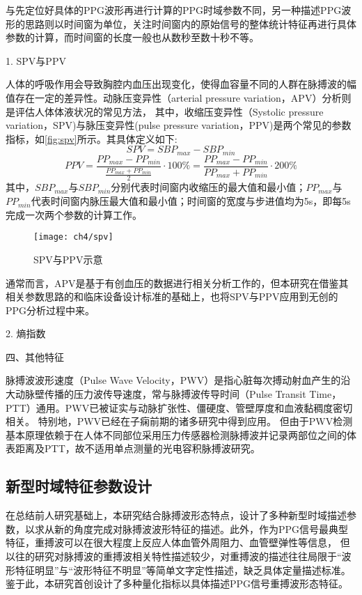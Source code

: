 与先定位好具体的PPG波形再进行计算的PPG时域参数不同，另一种描述PPG波形的思路则以时间窗为单位，关注时间窗内的原始信号的整体统计特征再进行具体参数的计算，而时间窗的长度一般也从数秒至数十秒不等。

1. SPV与PPV

人体的呼吸作用会导致胸腔内血压出现变化，使得血容量不同的人群在脉搏波的幅值存在一定的差异性。动脉压变异性（arterial pressure variation，APV）分析则是评估人体体液状况的常见方法，
其中，收缩压变异性（Systolic pressure variation，SPV)与脉压变异性(pulse pressure variation，PPV)是两个常见的参数指标\cite{GE2021,Michard1999,Perel1987,Michard2005}，如\autoref{fig:spv}所示。其具体定义如下\cite{GE2021}:
\begin{equation}
    \label{equ:spv}
    SPV=SBP_{max}-SBP_{min}
\end{equation}
\begin{equation}
    \label{equ:ppv}
    PPV=\frac{PP_{max}-PP_{min}}{\frac{PP_{max}+PP_{min}}{2}}\cdot 100\%=\frac{PP_{max}-PP_{min}}{PP_{max}+PP_{min}}\cdot 200\%
\end{equation}
其中，$SBP_{max}$与$SBP_{min}$分别代表时间窗内收缩压的最大值和最小值；$PP_{max}$与$PP_{min}$代表时间窗内脉压最大值和最小值；时间窗的宽度与步进值均为5s，即每5s完成一次两个参数的计算工作。
\begin{figure}[htbp]
    \centering
    \texttt{[image: ch4/spv]}
    \caption{\label{fig:spv}SPV与PPV示意}
\end{figure}

通常而言，APV是基于有创血压的数据进行相关分析工作的，但本研究在借鉴其相关参数思路的和临床设备设计标准的基础上，也将SPV与PPV应用到无创的PPG分析过程中来。

2. 熵指数

四、其他特征

脉搏波波形速度（Pulse Wave Velocity，PWV）是指心脏每次搏动射血产生的沿大动脉壁传播的压力波传导速度，常与脉搏波传导时间（Pulse Transit Time，PTT）通用。PWV已被证实与动脉扩张性、僵硬度、管壁厚度和血液黏稠度密切相关。
特别地，PWV已经在子痫前期的诸多研究中得到应用\cite{Tomsin2012,Katsipi2014,VivianaIvan2018,Ira2014}。
但由于PWV检测基本原理依赖于在人体不同部位采用压力传感器检测脉搏波并记录两部位之间的体表距离及PTT，故不适用单点测量的光电容积脉搏波研究。

\subsection{新型时域特征参数设计}
在总结前人研究基础上，本研究结合脉搏波形态特点，设计了多种新型时域描述参数，以求从新的角度完成对脉搏波波形特征的描述。此外，作为PPG信号最典型特征，重搏波可以在很大程度上反应人体血管外周阻力、血管壁弹性等信息，
但以往的研究对脉搏波的重搏波相关特性描述较少，对重搏波的描述往往局限于“波形特征明显”与“波形特征不明显”等简单文字定性描述，缺乏具体定量描述标准。鉴于此，本研究首创设计了多种量化指标以具体描述PPG信号重搏波形态特征。

